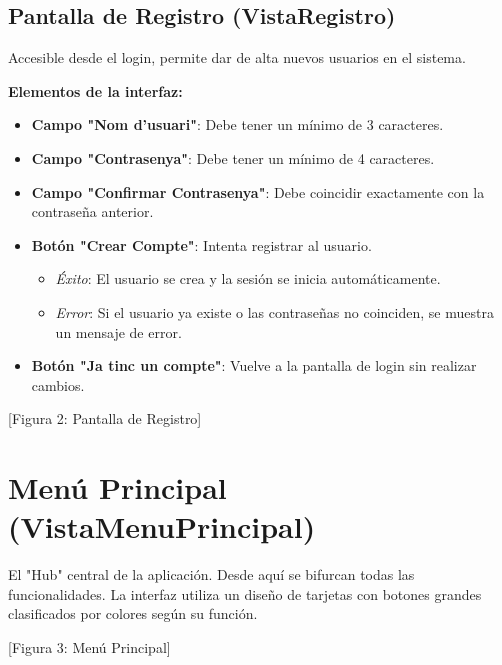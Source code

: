 \documentclass[a4paper,12pt]{article}
\begin{document}
\subsection{Pantalla de Registro (VistaRegistro)}
Accesible desde el login, permite dar de alta nuevos usuarios en el sistema.

\textbf{Elementos de la interfaz:}
\begin{itemize}
    \item \textbf{Campo "Nom d'usuari"}: Debe tener un mínimo de 3 caracteres.
    \item \textbf{Campo "Contrasenya"}: Debe tener un mínimo de 4 caracteres.
    \item \textbf{Campo "Confirmar Contrasenya"}: Debe coincidir exactamente con la contraseña anterior.
    \item \textbf{Botón "Crear Compte"}: Intenta registrar al usuario.
        \begin{itemize}
            \item \textit{Éxito}: El usuario se crea y la sesión se inicia automáticamente.
            \item \textit{Error}: Si el usuario ya existe o las contraseñas no coinciden, se muestra un mensaje de error.
        \end{itemize}
    \item \textbf{Botón "Ja tinc un compte"}: Vuelve a la pantalla de login sin realizar cambios.
\end{itemize}

[Figura 2: Pantalla de Registro]

\section{Menú Principal (VistaMenuPrincipal)}
El "Hub" central de la aplicación. Desde aquí se bifurcan todas las funcionalidades. La interfaz utiliza un diseño de tarjetas con botones grandes clasificados por colores según su función.

[Figura 3: Menú Principal]
\end{document}
